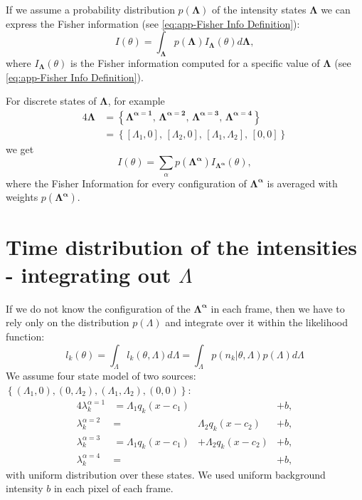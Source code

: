 If we assume a probability distribution $p(\bm{\Lambda})$  of the intensity states $\bm{\Lambda}$ we can express the Fisher information (see \autoref{eq:app-Fisher Info Definition}):
%
\begin{equation*}
	I(\theta) = \int_{\bm{\Lambda}}p(\bm{\Lambda})I_{\bm{\Lambda}}(\theta)d\bm{\Lambda},
\end{equation*}
%
where $I_{\bm{\Lambda}}(\theta)$ is the Fisher information computed for a specific value of $\bm{\Lambda}$ (see \autoref{eq:app-Fisher Info Definition}).

For discrete states of $\bm{\Lambda}$, for example  
%
\begin{alignat*}{4}
	\bm{\Lambda}
	&=\left\{\bm{\Lambda^{\alpha=1}},\,\bm{\Lambda^{\alpha=2}},\,\bm{\Lambda^{\alpha=3}},\,\bm{\Lambda^{\alpha=4}}\right\}\\
	&=\left\{[\Lambda_1,0],\,[\Lambda_2,0],\,[\Lambda_1,\Lambda_2],\,[0,0]\right\}
\end{alignat*}	
% 
we get
\begin{equation}
	I(\theta)=\sum_{\alpha}p(\bm{\Lambda^\alpha})I_{\bm{\Lambda^\alpha}}(\theta),
\end{equation}
%
where the Fisher Information for every configuration of $\bm{\Lambda^\alpha}$ is averaged with weights $p(\bm{\Lambda^\alpha})$. 


\section{Time distribution of the intensities - integrating out $\Lambda$}
\label{sub:Appendix Time-distribution-Integrating out}
If we do not know the configuration of the $\bm{\Lambda^\alpha}$ in each frame, then we have to rely only on the distribution $p(\Lambda)$ and integrate over it within the likelihood function:
%
\begin{equation}
	l_k(\theta)=\int_{\Lambda}l_k(\theta,\Lambda)d\Lambda=\int_{\Lambda}p(n_k|\theta,\Lambda)p(\Lambda)d\Lambda
	\label{eq:app-log lik - int out}
\end{equation}
%
We assume four state model of two sources: $\left\{ (\Lambda_1,0),(0,\Lambda_2),(\Lambda_1,\Lambda_2),(0,0)\right\}$: 
%
\begin{alignat}{4}
	\lambda_k^{\alpha=1}&=\Lambda_1q_k(x-c_1) & &+b,\nonumber\\ 
	\lambda_k^{\alpha=2}&=&\Lambda_2q_k(x-c_2) &+b,\nonumber\\ 
	\lambda_k^{\alpha=3}&=\Lambda_1q_k(x-c_1)&+\Lambda_2q_k(x-c_2)&+b,\nonumber\\ 
	\lambda_k^{\alpha=4}&=& &+b,
\end{alignat}
%
with uniform distribution over these states. We used uniform background intensity $b$ in each pixel of each frame. 

